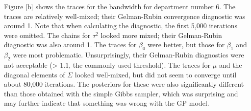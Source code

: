 \documentclass[paper=a4, fontsize=11pt]{scrartcl}
\begin{document}
Figure \ref{b} shows the traces for the bandwidth for department number 6. The traces are relatively well-mixed; their Gelman-Rubin convergence diagnostic was  around 1. Note that when calculating the diagnostic, the first 5,000 iterations were omitted. The chains for  $\tau^2$ looked more mixed; their Gelman-Rubin diagnostic was also around 1. The traces for $\beta_0$ were better, but  those for $\beta_1$ and $\beta_2$ were most problematic. Unsurprisingly, their Gelman-Rubin diagnostics were not acceptable (> 1.1, the commonly used threshold). The traces for $\mu$ and the diagonal elements of $\Sigma$ looked well-mixed, but did not seem to converge until about 80,000 iterations. The posteriors for these were also significantly different than those obtained with the simple Gibbs sampler, which  was surprising and may further indicate that something was wrong with the GP model.\\
\end{document}
